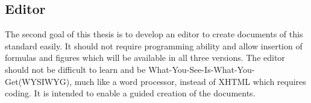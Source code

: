 \subsection{Editor}
The second goal of this thesis is to develop an editor to create documents of this standard easily. It should not require programming ability and allow insertion of formulas and figures which will be available in all three versions. The editor should not be difficult to learn and be  What-You-See-Is-What-You-Get(WYSIWYG), much like a word processor, instead of XHTML which requires coding. It is intended to enable a guided creation of the documents.